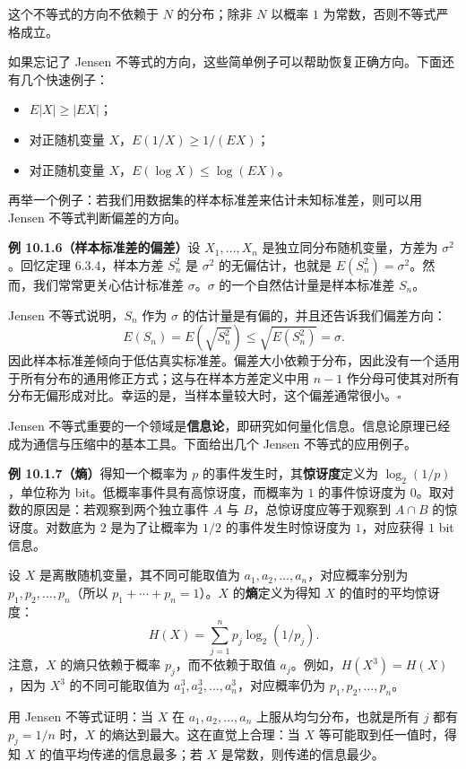 \documentclass[UTF8,12pt,a4paper,fontset=fandol]{ctexart}
\begin{document}
这个不等式的方向不依赖于 $N$ 的分布；除非 $N$ 以概率 $1$ 为常数，否则不等式严格成立。

如果忘记了 Jensen 不等式的方向，这些简单例子可以帮助恢复正确方向。下面还有几个快速例子：
\begin{itemize}
  \item $E|X|\ge |EX|$；
  \item 对正随机变量 $X$，$E(1/X)\ge 1/(EX)$；
  \item 对正随机变量 $X$，$E(\log X)\le \log(EX)$。
\end{itemize}

再举一个例子：若我们用数据集的样本标准差来估计未知标准差，则可以用 Jensen 不等式判断偏差的方向。

\noindent\textbf{例 10.1.6（样本标准差的偏差）}\quad 设 $X_1,\ldots,X_n$ 是独立同分布随机变量，方差为 $\sigma^2$。回忆定理 6.3.4，样本方差 $S_n^2$ 是 $\sigma^2$ 的无偏估计，也就是 $E(S_n^2)=\sigma^2$。然而，我们常常更关心估计标准差 $\sigma$。$\sigma$ 的一个自然估计量是样本标准差 $S_n$。

Jensen 不等式说明，$S_n$ 作为 $\sigma$ 的估计量是有偏的，并且还告诉我们偏差方向：
\[
  E(S_n)=E\left(\sqrt{S_n^2}\right)\le \sqrt{E(S_n^2)}=\sigma.
\]
因此样本标准差倾向于低估真实标准差。偏差大小依赖于分布，因此没有一个适用于所有分布的通用修正方式；这与在样本方差定义中用 $n-1$ 作分母可使其对所有分布无偏形成对比。幸运的是，当样本量较大时，这个偏差通常很小。$\square$

Jensen 不等式重要的一个领域是\textbf{信息论}，即研究如何量化信息。信息论原理已经成为通信与压缩中的基本工具。下面给出几个 Jensen 不等式的应用例子。

\noindent\textbf{例 10.1.7（熵）}\quad 得知一个概率为 $p$ 的事件发生时，其\textbf{惊讶度}定义为 $\log_2(1/p)$，单位称为 bit。低概率事件具有高惊讶度，而概率为 $1$ 的事件惊讶度为 $0$。取对数的原因是：若观察到两个独立事件 $A$ 与 $B$，总惊讶度应等于观察到 $A\cap B$ 的惊讶度。对数底为 $2$ 是为了让概率为 $1/2$ 的事件发生时惊讶度为 $1$，对应获得 $1$ bit 信息。

设 $X$ 是离散随机变量，其不同可能取值为 $a_1,a_2,\ldots,a_n$，对应概率分别为 $p_1,p_2,\ldots,p_n$（所以 $p_1+\cdots+p_n=1$）。$X$ 的\textbf{熵}定义为得知 $X$ 的值时的平均惊讶度：
\[
  H(X)=\sum_{j=1}^n p_j\log_2(1/p_j).
\]
注意，$X$ 的熵只依赖于概率 $p_j$，而不依赖于取值 $a_j$。例如，$H(X^3)=H(X)$，因为 $X^3$ 的不同可能取值为 $a_1^3,a_2^3,\ldots,a_n^3$，对应概率仍为 $p_1,p_2,\ldots,p_n$。

用 Jensen 不等式证明：当 $X$ 在 $a_1,a_2,\ldots,a_n$ 上服从均匀分布，也就是所有 $j$ 都有 $p_j=1/n$ 时，$X$ 的熵达到最大。这在直觉上合理：当 $X$ 等可能取到任一值时，得知 $X$ 的值平均传递的信息最多；若 $X$ 是常数，则传递的信息最少。
\end{document}
